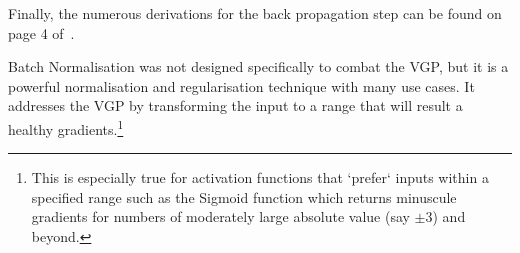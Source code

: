 {{    Finally, the numerous derivations for the back propagation step can be found on page 4 of~\citet{ioffe2015batch}.

    Batch Normalisation was not designed specifically to combat the VGP, but it is a powerful normalisation and regularisation technique with many use cases. It addresses the VGP by transforming the input to a range that will result a healthy gradients.\footnote{This is especially true for activation functions that `prefer` inputs within a specified range such as the Sigmoid function which returns minuscule gradients for numbers of moderately large absolute value (say $\pm3$) and beyond.}


  }
}

